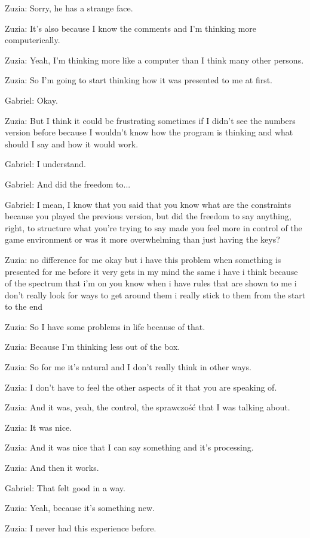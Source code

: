 Zuzia: Sorry, he has a strange face.

Zuzia: It's also because I know the comments and I'm thinking more computerically.

Zuzia: Yeah, I'm thinking more like a computer than I think many other persons.

Zuzia: So I'm going to start thinking how it was presented to me at first.

Gabriel: Okay.

Zuzia: But I think it could be frustrating sometimes if I didn't see the numbers version before because I wouldn't know how the program is thinking and what should I say and how it would work.

Gabriel: I understand.

Gabriel: And did the freedom to...

Gabriel: I mean, I know that you said that you know what are the constraints because you played the previous version, but did the freedom to say anything, right, to structure what you're trying to say made you feel more in control of the game environment or was it more overwhelming than just having the keys?

Zuzia: no difference for me okay but i have this problem when something is presented for me before it very gets in my mind the same i have i think because of the spectrum that i'm on you know when i have rules that are shown to me i don't really look for ways to get around them i really stick to them from the start to the end

Zuzia: So I have some problems in life because of that.

Zuzia: Because I'm thinking less out of the box.

Zuzia: So for me it's natural and I don't really think in other ways.

Zuzia: I don't have to feel the other aspects of it that you are speaking of.

Zuzia: And it was, yeah, the control, the sprawczość that I was talking about.

Zuzia: It was nice.

Zuzia: And it was nice that I can say something and it's processing.

Zuzia: And then it works.

Gabriel: That felt good in a way.

Zuzia: Yeah, because it's something new.

Zuzia: I never had this experience before.

